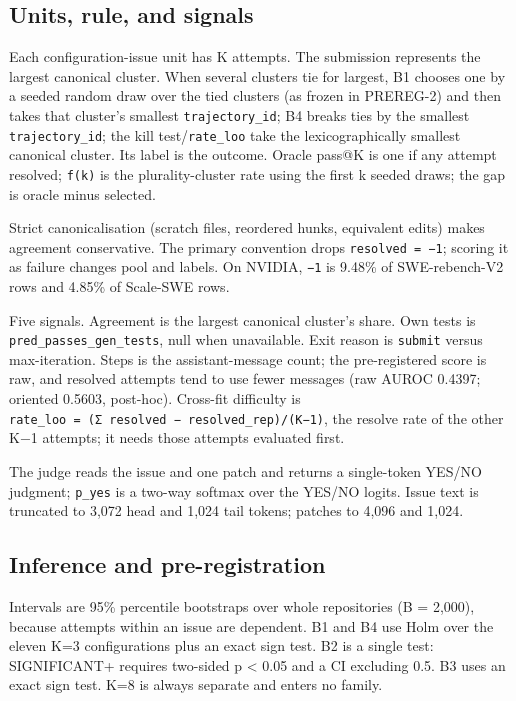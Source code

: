 \documentclass[
]{article}
\begin{document}
\subsection{Units, rule, and signals}\label{units-rule-and-signals}

Each configuration-issue unit has K attempts. The submission represents
the largest canonical cluster. When several clusters tie for largest, B1
chooses one by a seeded random draw over the tied clusters (as frozen in
PREREG-2) and then takes that cluster's smallest
\texttt{trajectory\_id}; B4 breaks ties by the smallest
\texttt{trajectory\_id}; the kill test/\texttt{rate\_loo} take the
lexicographically smallest canonical cluster. Its label is the outcome.
Oracle pass@K is one if any attempt resolved; \texttt{f(k)} is the
plurality-cluster rate using the first k seeded draws; the gap is oracle
minus selected.

Strict canonicalisation (scratch files, reordered hunks, equivalent
edits) makes agreement conservative. The primary convention drops
\texttt{resolved\ =\ −1}; scoring it as failure changes pool and labels.
On NVIDIA, \texttt{−1} is 9.48\% of SWE-rebench-V2 rows and 4.85\% of
Scale-SWE rows.

Five signals. Agreement is the largest canonical cluster's share. Own
tests is \texttt{pred\_passes\_gen\_tests}, null when unavailable. Exit
reason is \texttt{submit} versus max-iteration. Steps is the
assistant-message count; the pre-registered score is raw, and resolved
attempts tend to use fewer messages (raw AUROC 0.4397; oriented 0.5603,
post-hoc). Cross-fit difficulty is
\texttt{rate\_loo\ =\ (Σ\ resolved\ −\ resolved\_rep)/(K−1)}, the
resolve rate of the other K−1 attempts; it needs those attempts
evaluated first.

The judge reads the issue and one patch and returns a single-token
YES/NO judgment; \texttt{p\_yes} is a two-way softmax over the YES/NO
logits. Issue text is truncated to 3,072 head and 1,024 tail tokens;
patches to 4,096 and 1,024.

\subsection{Inference and
pre-registration}\label{inference-and-pre-registration}

Intervals are 95\% percentile bootstraps over whole repositories (B =
2,000), because attempts within an issue are dependent. B1 and B4 use
Holm over the eleven K=3 configurations plus an exact sign test. B2 is a
single test: SIGNIFICANT+ requires two-sided p \textless{} 0.05 and a CI
excluding 0.5. B3 uses an exact sign test. K=8 is always separate and
enters no family.
\end{document}
